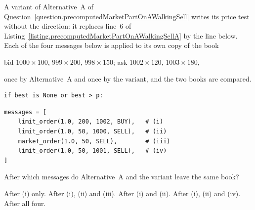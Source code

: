 \begin{question}
\label{question.priceTestWithoutTheDirection}
A variant of Alternative~A of Question~\ref{question.precomputedMarketPartOnAWalkingSell}
writes its price test without the direction:
it replaces line~6 of Listing~\ref{listing.precomputedMarketPartOnAWalkingSellA}
by the line below.
Each of the four messages below is applied to its own copy of the book
\begin{center}
 bid $1000 \times 100$, $999 \times 200$, $998 \times 150$;
 \quad
 ask $1002 \times 120$, $1003 \times 180$,
\end{center}
once by Alternative~A and once by the variant,
and the two books are compared.
\begin{lstlisting}[caption={Line 6 of the variant}, label=listing.priceTestWithoutTheDirectionLine]
        if best is None or best > p:
\end{lstlisting}
\begin{lstlisting}[caption={Four messages}, label=listing.priceTestWithoutTheDirectionMessages]
messages = [
    limit_order(1.0, 200, 1002, BUY),   # (i)
    limit_order(1.0, 50, 1000, SELL),   # (ii)
    market_order(1.0, 50, SELL),        # (iii)
    limit_order(1.0, 50, 1001, SELL),   # (iv)
]
\end{lstlisting}
After which messages do Alternative~A and the variant leave the same book?
\begin{choices}
 \choice After (i) only.
 \choice After (i), (ii) and (iii).
 \correctchoice After (i) and (ii).
 \choice After (i), (ii) and (iv).
 \choice After all four.
\end{choices}
\end{question}

